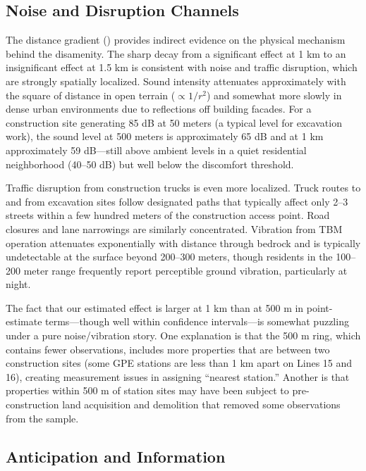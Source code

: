 \documentclass[12pt]{article}
\begin{document}


\subsection{Noise and Disruption Channels}

The distance gradient () provides indirect evidence on the physical mechanism behind the disamenity. The sharp decay from a significant effect at 1 km to an insignificant effect at 1.5 km is consistent with noise and traffic disruption, which are strongly spatially localized. Sound intensity attenuates approximately with the square of distance in open terrain ($\propto 1/r^2$) and somewhat more slowly in dense urban environments due to reflections off building facades. For a construction site generating 85 dB at 50 meters (a typical level for excavation work), the sound level at 500 meters is approximately 65 dB and at 1 km approximately 59 dB---still above ambient levels in a quiet residential neighborhood (40--50 dB) but well below the discomfort threshold.

Traffic disruption from construction trucks is even more localized. Truck routes to and from excavation sites follow designated paths that typically affect only 2--3 streets within a few hundred meters of the construction access point. Road closures and lane narrowings are similarly concentrated. Vibration from TBM operation attenuates exponentially with distance through bedrock and is typically undetectable at the surface beyond 200--300 meters, though residents in the 100--200 meter range frequently report perceptible ground vibration, particularly at night.

The fact that our estimated effect is larger at 1 km than at 500 m in point-estimate terms---though well within confidence intervals---is somewhat puzzling under a pure noise/vibration story. One explanation is that the 500 m ring, which contains fewer observations, includes more properties that are between two construction sites (some GPE stations are less than 1 km apart on Lines 15 and 16), creating measurement issues in assigning ``nearest station.'' Another is that properties within 500 m of station sites may have been subject to pre-construction land acquisition and demolition that removed some observations from the sample.

\subsection{Anticipation and Information}
\end{document}
